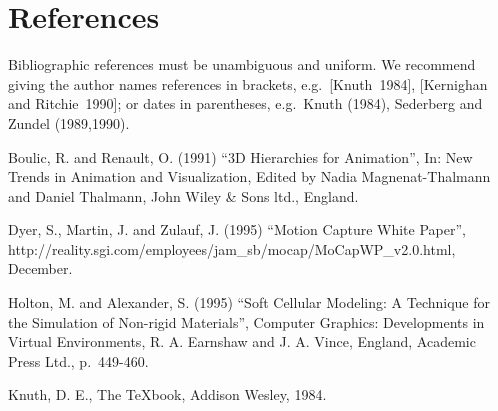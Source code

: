 \section{References}
Bibliographic references must be unambiguous and uniform.  We
recommend giving the author names references in brackets,
e.g.~[Knuth~1984], [Kernighan and Ritchie~1990]; or dates in
parentheses, e.g.~Knuth (1984), Sederberg and Zundel (1989,1990).

\begin{thebibliography}{99}
 Boulic, R. and Renault, O. (1991) ``3D Hierarchies for
  Animation'', In: New Trends in Animation and Visualization, Edited
  by Nadia Magnenat-Thalmann and Daniel Thalmann, John Wiley \& Sons
  ltd., England.

 Dyer, S., Martin, J. and Zulauf, J. (1995) ``Motion
  Capture White Paper'',
  http://reality.sgi.com/employees/jam\_sb/mocap/MoCapWP\_v2.0.html,
  December.

 Holton, M. and Alexander, S. (1995) ``Soft Cellular
  Modeling: A Technique for the Simulation of Non-rigid Materials'',
  Computer Graphics: Developments in Virtual Environments, R. A.
  Earnshaw and J. A. Vince, England, Academic Press Ltd., p.~449-460.

 Knuth, D. E., The TeXbook, Addison Wesley, 1984.
\end{thebibliography}

